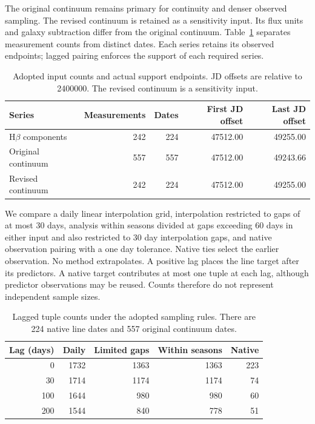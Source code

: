 The original continuum remains primary for continuity and denser observed sampling. The revised continuum is retained as a sensitivity input. Its flux units and galaxy subtraction differ from the original continuum. Table~\ref{tab:adopted_inputs} separates measurement counts from distinct dates. Each series retains its observed endpoints; lagged pairing enforces the support of each required series.

\begin{table}
\centering
\begin{tabular}{lrrrr}
\hline
Series & Measurements & Dates & First JD offset & Last JD offset \\
\hline
H$\beta$ components & 242 & 224 & 47512.00 & 49255.00 \\
Original continuum & 557 & 557 & 47512.00 & 49243.66 \\
Revised continuum & 242 & 224 & 47512.00 & 49255.00 \\
\hline
\end{tabular}
\caption{Adopted input counts and actual support endpoints. JD offsets are relative to 2400000. The revised continuum is a sensitivity input.}
\label{tab:adopted_inputs}
\end{table}

We compare a daily linear interpolation grid, interpolation restricted to gaps of at most 30 days, analysis within seasons divided at gaps exceeding 60 days in either input and also restricted to 30 day interpolation gaps, and native observation pairing with a one day tolerance. Native ties select the earlier observation. No method extrapolates. A positive lag places the line target after its predictors. A native target contributes at most one tuple at each lag, although predictor observations may be reused. Counts therefore do not represent independent sample sizes.

\begin{table}
\centering
\begin{tabular}{rrrrr}
\hline
Lag (days) & Daily & Limited gaps & Within seasons & Native \\
\hline
0 & 1732 & 1363 & 1363 & 223 \\
30 & 1714 & 1174 & 1174 & 74 \\
100 & 1644 & 980 & 980 & 60 \\
200 & 1544 & 840 & 778 & 51 \\
\hline
\end{tabular}
\caption{Lagged tuple counts under the adopted sampling rules. There are 224 native line dates and 557 original continuum dates.}
\label{tab:adopted_sampling_counts}
\end{table}

